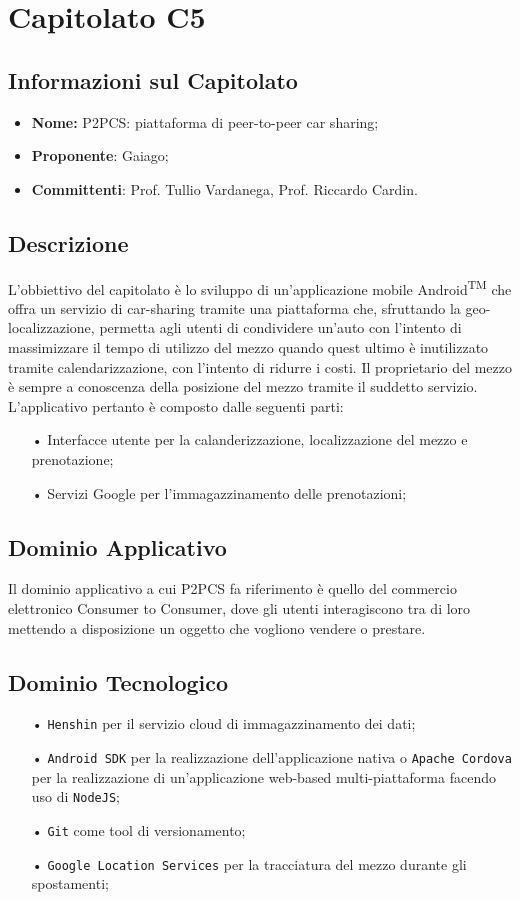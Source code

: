 \section{Capitolato C5}
\subsection{Informazioni sul Capitolato}
\begin{itemize}
	\item \textbf{Nome:} P2PCS: piattaforma di peer-to-peer car sharing;
	\item \textbf{Proponente}: Gaiago;
	\item \textbf{Committenti}: Prof. Tullio Vardanega, Prof. Riccardo Cardin.
\end{itemize}
\subsection{Descrizione}
L'obbiettivo del capitolato è lo sviluppo di un'applicazione mobile Android\textsuperscript{TM} che offra un servizio di car-sharing tramite una piattaforma che, sfruttando la geo-localizzazione, permetta agli utenti di condividere un'auto con l'intento di massimizzare il tempo di utilizzo del mezzo quando quest ultimo è inutilizzato tramite calendarizzazione, con l'intento di ridurre i costi. Il proprietario del mezzo è sempre a conoscenza della posizione del mezzo tramite il suddetto servizio. L'applicativo pertanto è composto dalle seguenti parti:
\begin{itemize}
\item[•] Interfacce utente per la calanderizzazione, localizzazione del mezzo e prenotazione;
\item[•] Servizi Google per l'immagazzinamento delle prenotazioni;
\end{itemize}
\subsection{Dominio Applicativo}
Il dominio applicativo a cui P2PCS fa riferimento è quello del commercio elettronico Consumer to Consumer, dove gli utenti interagiscono tra di loro mettendo a disposizione un oggetto che vogliono vendere o prestare.
\subsection{Dominio Tecnologico}
\begin{itemize}
\item[•] \texttt{Henshin} per il servizio cloud di immagazzinamento dei dati;
\item[•] \texttt{Android SDK} per la realizzazione dell'applicazione nativa o \texttt{Apache Cordova} per la realizzazione di un'applicazione web-based multi-piattaforma facendo uso di \texttt{NodeJS};
\item[•] \texttt{Git} come tool di versionamento;
\item[•] \texttt{Google Location Services} per la tracciatura del mezzo durante gli spostamenti;
\end{itemize}
